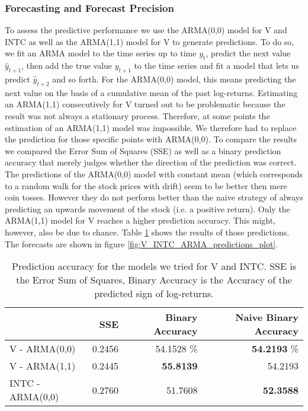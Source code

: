 \subsubsection{Forecasting and Forecast Precision}
To assess the predictive performance we use the ARMA(0,0) model for V and INTC as well as the ARMA(1,1) model for V to generate predictions. To do so, we fit an ARMA model to the time series up to time $y_t$, predict the next value $\hat{y}_{t+1}$, then add the true value $y_{t+1}$ to the time series and fit a model that lets us predict $\hat{y}_{t + 2}$ and so forth. For the ARMA(0,0) model, this means predicting the next value on the basis of a cumulative mean of the past log-returns. Estimating an ARMA(1,1) consecutively for V turned out to be problematic because the result was not always a stationary process. Therefore, at some points the estimation of an ARMA(1,1) model was impossible. We therefore had to replace the prediction for those specific points with ARMA(0,0). 
To compare the results we compared the Error Sum of Squares (SSE) as well as a binary prediction accuracy that merely judges whether the direction of the prediction was correct. The predictions of the ARMA(0,0) model with constant mean (which corresponds to a random walk for the stock prices with drift) seem to be better then mere coin tosses. However they do not perform better than the naive strategy of always predicting an upwards movement of the stock (i.e. a positive return). Only the ARMA(1,1) model for V reaches a higher prediction accuracy. This might, however, also be due to chance. Table \ref{tab:V_INTC_ARMA_predictions} shows the results of those predictions. The forecasts are shown in figure \ref{fig:V_INTC_ARMA_predictions_plot}. 

\begin{table}[]
    \centering
    \small
    \begin{tabular}{lrrr}
    \toprule
    {}  & SSE & Binary Accuracy & Naive Binary Accuracy \\
    \midrule
    V - ARMA(0,0) & 0.2456 & 54.1528 \% & \textbf{54.2193} \% \\
    V - ARMA(1,1) & 0.2445 & \textbf{55.8139} & 54.2193 \\
    INTC - ARMA(0,0) & 0.2760 & 51.7608 & \textbf{52.3588} \\
    \bottomrule
    \end{tabular}
    \caption{Prediction accuracy for the models we tried for V and INTC. SSE is the Error Sum of Squares, Binary Accuracy is the Accuracy of the predicted sign of log-returns.}
    \label{tab:V_INTC_ARMA_predictions}
\end{table}{}

